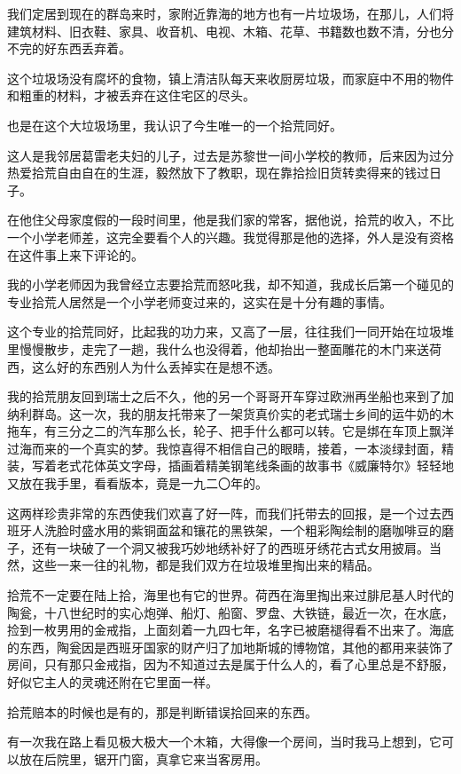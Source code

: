 \par 我们定居到现在的群岛来时，家附近靠海的地方也有一片垃圾场，在那儿，人们将建筑材料、旧衣鞋、家具、收音机、电视、木箱、花草、书籍数也数不清，分也分不完的好东西丢弃着。
\par 这个垃圾场没有腐坏的食物，镇上清洁队每天来收厨房垃圾，而家庭中不用的物件和粗重的材料，才被丢弃在这住宅区的尽头。
\par 也是在这个大垃圾场里，我认识了今生唯一的一个拾荒同好。
\par 这人是我邻居葛雷老夫妇的儿子，过去是苏黎世一间小学校的教师，后来因为过分热爱拾荒自由自在的生涯，毅然放下了教职，现在靠拾捡旧货转卖得来的钱过日子。
\par 在他住父母家度假的一段时间里，他是我们家的常客，据他说，拾荒的收入，不比一个小学老师差，这完全要看个人的兴趣。我觉得那是他的选择，外人是没有资格在这件事上来下评论的。
\par 我的小学老师因为我曾经立志要拾荒而怒叱我，却不知道，我成长后第一个碰见的专业拾荒人居然是一个小学老师变过来的，这实在是十分有趣的事情。
\par 这个专业的拾荒同好，比起我的功力来，又高了一层，往往我们一同开始在垃圾堆里慢慢散步，走完了一趟，我什么也没得着，他却抬出一整面雕花的木门来送荷西，这么好的东西别人为什么丢掉实在是想不透。
\par 我的拾荒朋友回到瑞士之后不久，他的另一个哥哥开车穿过欧洲再坐船也来到了加纳利群岛。这一次，我的朋友托带来了一架货真价实的老式瑞士乡间的运牛奶的木拖车，有三分之二的汽车那么长，轮子、把手什么都可以转。它是绑在车顶上飘洋过海而来的一个真实的梦。我惊喜得不相信自己的眼睛，接着，一本淡绿封面，精装，写着老式花体英文字母，插画着精美钢笔线条画的故事书《威廉特尔》轻轻地又放在我手里，看看版本，竟是一九二〇年的。
\par 这两样珍贵非常的东西使我们欢喜了好一阵，而我们托带去的回报，是一个过去西班牙人洗脸时盛水用的紫铜面盆和镶花的黑铁架，一个粗彩陶绘制的磨咖啡豆的磨子，还有一块破了一个洞又被我巧妙地绣补好了的西班牙绣花古式女用披肩。当然，这些一来一往的礼物，都是我们双方在垃圾堆里掏出来的精品。
\par 拾荒不一定要在陆上拾，海里也有它的世界。荷西在海里掏出来过腓尼基人时代的陶瓮，十八世纪时的实心炮弹、船灯、船窗、罗盘、大铁链，最近一次，在水底，捡到一枚男用的金戒指，上面刻着一九四七年，名字已被磨褪得看不出来了。海底的东西，陶瓮因是西班牙国家的财产归了加地斯城的博物馆，其他的都用来装饰了房间，只有那只金戒指，因为不知道过去是属于什么人的，看了心里总是不舒服，好似它主人的灵魂还附在它里面一样。
\par 拾荒赔本的时候也是有的，那是判断错误拾回来的东西。
\par 有一次我在路上看见极大极大一个木箱，大得像一个房间，当时我马上想到，它可以放在后院里，锯开门窗，真拿它来当客房用。
